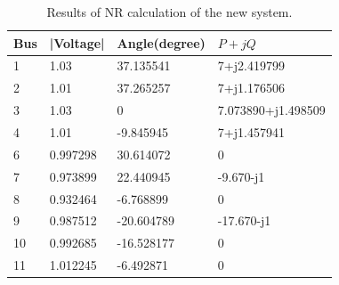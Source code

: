 \documentclass[conference]{IEEEtran}
\begin{document}
\begin{table}[H]
	\vspace{-2mm}
	\begin{center}
		\begin{tabular}{|l|l|l|l|}
			\hline
			Bus & |Voltage| & Angle(degree) & $P+jQ$ \\ \hline
			1 & 1.03 & 37.135541 & 7+j2.419799 \\ \hline
			2 & 1.01 & 37.265257 & 7+j1.176506 \\ \hline
			3 & 1.03 & 0 & 7.073890+j1.498509 \\ \hline
			4 & 1.01 & -9.845945 & 7+j1.457941 \\ \hline
			6 & 0.997298 & 30.614072 & 0 \\ \hline
			7 & 0.973899 & 22.440945 & -9.670-j1 \\ \hline
			8 & 0.932464 & -6.768899 & 0 \\ \hline
			9 & 0.987512 & -20.604789 & -17.670-j1 \\ \hline
			10 & 0.992685 & -16.528177 & 0 \\ \hline
			11 & 1.012245 & -6.492871 & 0 \\ \hline
		\end{tabular}
	\end{center}
	\caption{Results of NR calculation of the new system.}
	\vspace{-6mm}
	\label{tab:nr2}
\end{table}
\end{document}
